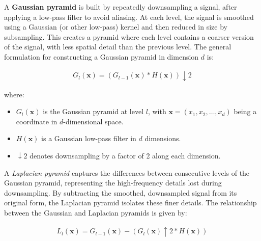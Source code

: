 A \textbf{Gaussian pyramid} is built by repeatedly downsampling a signal, after applying a low-pass filter to avoid aliasing. At each level, the signal is smoothed using a Gaussian (or other low-pass) kernel and then reduced in size by subsampling. This creates a pyramid where each level contains a coarser version of the signal, with less spatial detail than the previous level. The general formulation for constructing a Gaussian pyramid in dimension \(d\) is:

\begin{align}
  G_l(\mathbf{x}) = (G_{l-1}(\mathbf{x}) * H(\mathbf{x})) \downarrow 2
\end{align}

where:
\begin{itemize}
  \item \(G_l(\mathbf{x})\) is the Gaussian pyramid at level \(l\), with \(\mathbf{x} = (x_1, x_2, \dots, x_d)\) being a coordinate in \(d\)-dimensional space.
  \item \(H(\mathbf{x})\) is a Gaussian low-pass filter in \(d\) dimensions.
  \item \(\downarrow 2\) denotes downsampling by a factor of 2 along each dimension.
\end{itemize}
 
A \textit{Laplacian pyramid} captures the differences between consecutive levels of the Gaussian pyramid, representing the high-frequency details lost during downsampling. By subtracting the smoothed, downsampled signal from its original form, the Laplacian pyramid isolates these finer details. The relationship between the Gaussian and Laplacian pyramids is given by:

\begin{align}
  L_l(\mathbf{x}) = G_{l-1}(\mathbf{x}) - (G_l(\mathbf{x}) \uparrow 2 * H(\mathbf{x}))
\end{align}


